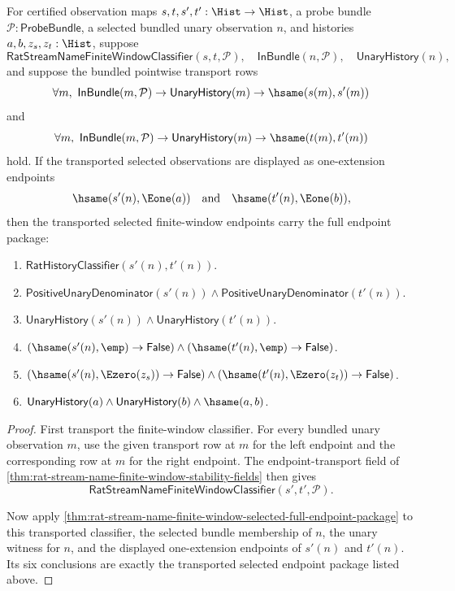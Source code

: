 \begin{theorem}
\label{thm:rat-stream-name-finite-window-transported-selected-full-endpoint-package}
For certified observation maps $s,t,s',t':\Hist\to\Hist$, a probe bundle
$\mathcal{P}:\mathsf{ProbeBundle}$, a selected bundled unary observation $n$,
and histories $a,b,z_s,z_t:\Hist$, suppose
$$
\mathsf{RatStreamNameFiniteWindowClassifier}(s,t,\mathcal{P}),
\quad
\mathsf{InBundle}(n,\mathcal{P}),
\quad
\mathsf{UnaryHistory}(n),
$$
and suppose the bundled pointwise transport rows
$$
\forall m,\ \mathsf{InBundle}(m,\mathcal{P})\to
\mathsf{UnaryHistory}(m)\to\hsame(s(m),s'(m))
$$
and
$$
\forall m,\ \mathsf{InBundle}(m,\mathcal{P})\to
\mathsf{UnaryHistory}(m)\to\hsame(t(m),t'(m))
$$
hold. If the transported selected observations are displayed as one-extension
endpoints
$$
\hsame(s'(n),\Eone(a))\quad\text{and}\quad \hsame(t'(n),\Eone(b)),
$$
then the transported selected finite-window endpoints carry the full endpoint
package:
\begin{enumerate}
  \item $\mathsf{RatHistoryClassifier}(s'(n),t'(n))$.
  \item $\mathsf{PositiveUnaryDenominator}(s'(n))\land
  \mathsf{PositiveUnaryDenominator}(t'(n))$.
  \item $\mathsf{UnaryHistory}(s'(n))\land\mathsf{UnaryHistory}(t'(n))$.
  \item $(\hsame(s'(n),\emp)\to\mathsf{False})\land
  (\hsame(t'(n),\emp)\to\mathsf{False})$.
  \item $(\hsame(s'(n),\Ezero(z_s))\to\mathsf{False})\land
  (\hsame(t'(n),\Ezero(z_t))\to\mathsf{False})$.
  \item $\mathsf{UnaryHistory}(a)\land\mathsf{UnaryHistory}(b)\land
  \hsame(a,b)$.
\end{enumerate}
\end{theorem}
\begin{proof}
First transport the finite-window classifier. For every bundled unary
observation $m$, use the given transport row at $m$ for the left endpoint and
the corresponding row at $m$ for the right endpoint. The endpoint-transport
field of \autoref{thm:rat-stream-name-finite-window-stability-fields} then
gives
$$
\mathsf{RatStreamNameFiniteWindowClassifier}(s',t',\mathcal{P}).
$$

Now apply
\autoref{thm:rat-stream-name-finite-window-selected-full-endpoint-package} to
this transported classifier, the selected bundle membership of $n$, the unary
witness for $n$, and the displayed one-extension endpoints of $s'(n)$ and
$t'(n)$. Its six conclusions are exactly the transported selected endpoint
package listed above.
\end{proof}

